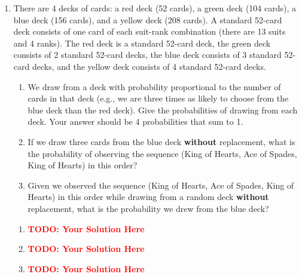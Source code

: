 \documentclass[12pt]{article}
\def\todo#1{\textcolor{red}{\textbf{#1}}}
\renewcommand{\|}{\mid}
\begin{document}
\begin{enumerate}
\item There are 4 decks of cards: a red deck (52 cards), a green deck (104 cards), a blue deck (156 cards), and a yellow deck (208 cards). A standard 52-card deck consists of one card of each suit-rank combination (there are 13 suits and 4 ranks). The red deck is a standard 52-card deck, the green deck consists of 2 standard 52-card decks, the blue deck consists of 3 standard 52-card decks, and the yellow deck consists of 4 standard 52-card decks. 
\begin{enumerate}
    \item We draw from a deck with probability proportional to the number of cards in that deck (e.g., we are three times as likely to choose from the blue deck than the red deck). Give the probabilities of drawing from each deck. Your answer should be 4 probabilities that sum to 1.
    \item If we draw three cards from the blue deck \textbf{without} replacement, what is the probability of observing the sequence (King of Hearts, Ace of Spades, King of Hearts) in this order?
    \item Given we observed the sequence (King of Hearts, Ace of Spades, King of Hearts) in this order while drawing from a random deck \textbf{without} replacement, what is the probability we drew from the blue deck?
\end{enumerate}

\begin{tcolorbox}
\begin{enumerate}
\item \todo{TODO: Your Solution Here}
\item \todo{TODO: Your Solution Here}
\item \todo{TODO: Your Solution Here}
\end{enumerate}
\end{tcolorbox}



\end{enumerate}
\end{document}
